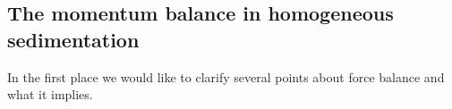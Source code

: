 


  

\subsection{ The momentum balance in homogeneous sedimentation}

In the first place we would like to clarify several points about force balance and what it implies. 


